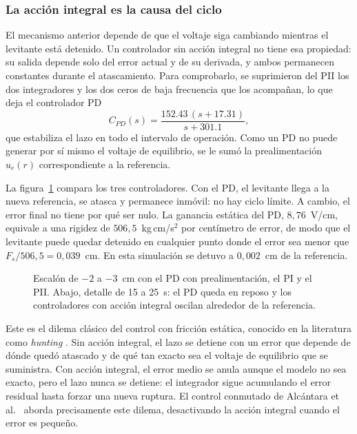 \subsubsection{La acción integral es la causa del ciclo}

El mecanismo anterior depende de que el voltaje siga cambiando mientras el levitante está detenido. Un controlador sin acción integral no tiene esa propiedad: su salida depende solo del error actual y de su derivada, y ambos permanecen constantes durante el atascamiento. Para comprobarlo, se suprimieron del PII los dos integradores y los dos ceros de baja frecuencia que los acompañan, lo que deja el controlador PD
\[
C_{PD}(s) = \frac{152.43\,(s+17.31)}{s+301.1},
\]
que estabiliza el lazo en todo el intervalo de operación. Como un PD no puede generar por sí mismo el voltaje de equilibrio, se le sumó la prealimentación $u_e(r)$ correspondiente a la referencia.

La figura~\ref{fig:pd_pi_pii} compara los tres controladores. Con el PD, el levitante llega a la nueva referencia, se atasca y permanece inmóvil: no hay ciclo límite. A cambio, el error final no tiene por qué ser nulo. La ganancia estática del PD, $8{,}76$~V/cm, equivale a una rigidez de $506{,}5$~kg\,cm/s$^2$ por centímetro de error, de modo que el levitante puede quedar detenido en cualquier punto donde el error sea menor que $F_s/506{,}5 = 0{,}039$~cm. En esta simulación se detuvo a $0{,}002$~cm de la referencia.

\begin{figure}[ht]
    \centering
    
    \caption[PD, PI y PII con atascamiento-deslizamiento]{Escalón de $-2$ a $-3$~cm con el PD con prealimentación, el PI y el PII. Abajo, detalle de 15 a 25~s: el PD queda en reposo y los controladores con acción integral oscilan alrededor de la referencia.}
    \label{fig:pd_pi_pii}
\end{figure}

Este es el dilema clásico del control con fricción estática, conocido en la literatura como \emph{hunting} \cite{olsson}. Sin acción integral, el lazo se detiene con un error que depende de dónde quedó atascado y de qué tan exacto sea el voltaje de equilibrio que se suministra. Con acción integral, el error medio se anula aunque el modelo no sea exacto, pero el lazo nunca se detiene: el integrador sigue acumulando el error residual hasta forzar una nueva ruptura. El control conmutado de Alcántara et al.\ \cite{alcantara} aborda precisamente este dilema, desactivando la acción integral cuando el error es pequeño.

